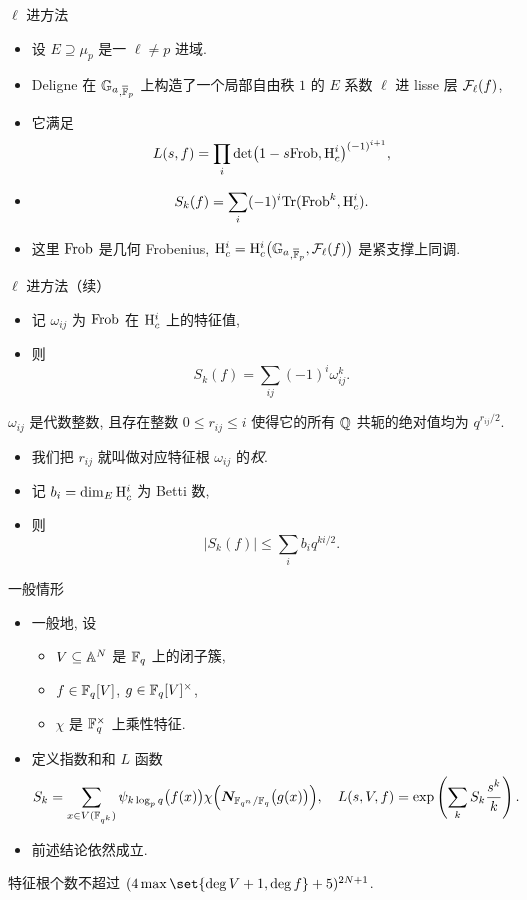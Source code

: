 \documentclass[aspectratio=169,handout]{ctexbeamer}
\begin{document}
\begin{frame}{$\ell$ 进方法}
	\begin{itemize}
		\item 设 $E\supseteq \mu_p$ 是一 $\ell\neq p$ 进域.
		\item Deligne 在 ${\mathbb{G}_a}_{,\overline{{\mathbb{F}}}_p}$ 上构造了一个局部自由秩 $1$ 的 $E$ 系数 $\ell$ 进 lisse 层 ${\mathcal{F}}_\ell(f)$,
		\item 它满足
		\[
			L(s,f)=\prod_i \det\bigl(1-s {\mathrm{Frob}},{\mathrm{H}}^i_c\bigr)^{(-1)^{i+1}},
		\]
		\item
		\[
			S_k(f)=\sum_i (-1)^i{\mathrm{Tr}}({\mathrm{Frob}}^k,{\mathrm{H}}_c^i).
		\]
		\item 这里 ${\mathrm{Frob}}$ 是几何 Frobenius, ${\mathrm{H}}_c^i={\mathrm{H}}_c^i\bigl({\mathbb{G}_a}_{,\overline{{\mathbb{F}}}_p},{\mathcal{F}}_\ell(f)\bigr)$ 是紧支撑上同调.
	\end{itemize}
\end{frame}


\begin{frame}{$\ell$ 进方法（续）}
	\begin{itemize}
		\item 记 $\omega_{ij}$ 为 ${\mathrm{Frob}}$ 在 ${\mathrm{H}}^i_c$ 上的特征值, 
		\item 则
		\[
			S_k(f)=\sum_{ij}(-1)^i \omega_{ij}^k.
		\]
	\end{itemize}
	\onslide<+->
	\begin{theorem}[][Deligne]
		$\omega_{ij}$ 是代数整数, 且存在整数 $0\le r_{ij}\le i$ 使得它的所有 ${\mathbb{Q}}$ 共轭的绝对值均为 $q^{r_{ij}/2}$.
	\end{theorem}
	\begin{itemize}
		\item 我们把 $r_{ij}$ 就叫做对应特征根 $\omega_{ij}$ 的\emph{权}.
		\item 记 $b_i=\dim_{E}{\mathrm{H}}^i_c$ 为 Betti 数, 
		\item 则
		\[
			|S_k(f)|\le \sum_i b_i q^{ki/2}.
		\]
	\end{itemize}
\end{frame}


\begin{frame}{一般情形}
	\begin{itemize}
		\item 一般地, 设
		\begin{itemize}
			\item $V\subseteq {\mathbb{A}}^N$ 是 ${\mathbb{F}}_q$ 上的闭子簇,
			\item $f\in {\mathbb{F}}_q[V]$, $g\in{\mathbb{F}}_q[V]^\times$,
			\item $\chi$ 是 ${\mathbb{F}}_q^\times$ 上乘性特征.
		\end{itemize}
		\item 定义指数和和 $L$ 函数
		\[
			S_k=\sum_{x\in V({\mathbb{F}}_{q^k})}\psi_{k\log_p q}\bigl(f(x)\bigr)\chi\Bigl({\boldsymbol{N}}_{{\mathbb{F}}_{q^n}/{\mathbb{F}}_q}\bigl(g(x)\bigr)\Bigr),\quad
			L(s,V,f)=\exp\left(\sum_k S_k\frac{s^k}k\right).
		\]
		\item 前述结论依然成立.
	\end{itemize}
	\onslide<+->
	\begin{theorem}[][Bombieri1978]
		特征根个数不超过 $(4\max\set{\deg V+1,\deg f}+5)^{2N+1}$.
	\end{theorem}
\end{frame}
\end{document}

